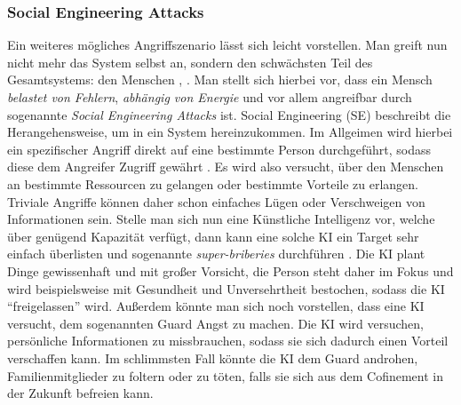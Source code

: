         \subsubsection{Social Engineering Attacks}\label{section:sea}
        Ein weiteres mögliches Angriffszenario lässt sich leicht vorstellen. Man greift nun nicht mehr das System selbst
        an, sondern den schwächsten Teil des Gesamtsystems: den Menschen \cite{armstrongforthcoming}, \cite{yampolskiy2012leakproofing}.
        Man stellt sich hierbei vor, dass ein Mensch \textit{belastet von Fehlern}, \textit{abhängig von Energie}
        und vor allem angreifbar durch sogenannte \textit{Social Engineering Attacks} ist. Social Engineering (SE)
        beschreibt die Herangehensweise, um in ein System hereinzukommen. Im Allgeimen wird hierbei ein spezifischer Angriff direkt
        auf eine bestimmte Person durchgeführt, sodass diese dem Angreifer Zugriff gewährt \cite[s. 198]{yampolskiy2012leakproofing}.
        Es wird also versucht, über den Menschen an bestimmte Ressourcen zu gelangen oder bestimmte Vorteile zu erlangen.
        Triviale Angriffe können daher schon einfaches Lügen oder Verschweigen von Informationen sein. Stelle man sich
        nun eine Künstliche Intelligenz vor, welche über genügend Kapazität verfügt, dann kann eine solche KI ein Target
        sehr einfach überlisten und sogenannte \textit{super-briberies} durchführen \cite{yampolskiy2012leakproofing}.
        Die KI plant Dinge gewissenhaft und mit großer Vorsicht, die Person steht daher im Fokus und wird beispielsweise
        mit Gesundheit und Unversehrtheit bestochen, sodass die KI ``freigelassen'' wird. Außerdem könnte man sich noch
        vorstellen, dass eine KI versucht, dem sogenannten Guard Angst zu machen. Die KI wird versuchen, persönliche
        Informationen zu missbrauchen, sodass sie sich dadurch einen Vorteil verschaffen kann. Im schlimmsten Fall
        könnte die KI dem Guard androhen, Familienmitglieder zu foltern oder zu töten, falls sie sich aus dem Cofinement
        in der Zukunft befreien kann.

